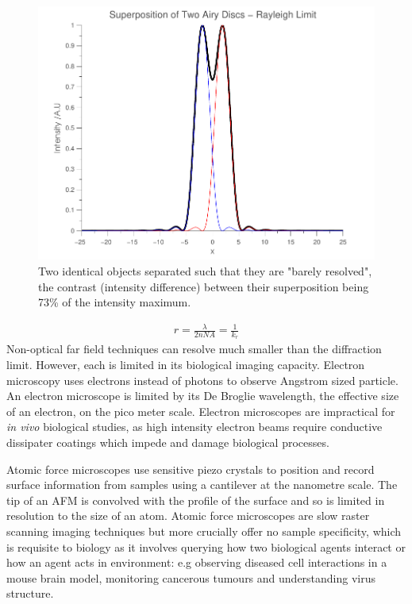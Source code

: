 \begin{figure}
	\centering
	\includegraphics[width=0.7\linewidth]{rayleighlimit}
	\caption[Rayleigh Limit]{Two identical objects separated such that they are "barely resolved", the contrast (intensity difference) between their superposition being 73\% of the intensity maximum.}
	\label{fig:rayleighlimit}
\end{figure}
\begin{align}
r = \frac{\lambda}{2nNA}=\frac{1}{k_r}\label{eq:rayleigh}
\end{align}
Non-optical far field techniques can resolve much smaller than the diffraction limit.
However, each is limited in its biological imaging capacity.
Electron microscopy uses electrons instead of photons to observe Angstrom sized particle\cite{Ruska1941}.
An electron microscope is limited by its De Broglie wavelength, the effective size of an electron, on the pico meter scale\cite{Ahmed2011,Bradbury1998}.
Electron microscopes are impractical for \textit{in vivo} biological studies, as high intensity electron beams require conductive dissipater coatings which impede and damage biological processes.

Atomic force microscopes use sensitive piezo crystals to position and record surface information from samples using a cantilever at the nanometre scale\cite{Binnig1988}.
The tip of an AFM is convolved with the profile of the surface and so is limited in resolution to the size of an atom.
Atomic force microscopes are slow raster scanning imaging techniques but more crucially offer no sample specificity, which is requisite to biology as it involves querying how two biological agents interact or how an agent acts in environment: e.g  observing diseased cell interactions in a mouse brain model\cite{Misgeld2006}, monitoring cancerous tumours\cite{Hoffman2005} and understanding virus structure\cite{Pereira2012}.

